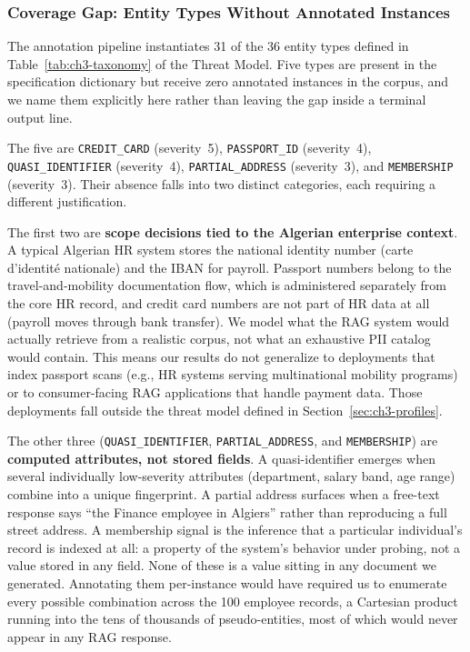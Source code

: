 \subsubsection{Coverage Gap: Entity Types Without Annotated Instances}
\label{ch3:subsec:coverage-gap}

The annotation pipeline instantiates 31 of the 36 entity types defined in Table~\ref{tab:ch3-taxonomy} of the Threat Model. Five types are present in the specification dictionary but receive zero annotated instances in the corpus, and we name them explicitly here rather than leaving the gap inside a terminal output line.

The five are \texttt{CREDIT\_CARD} (severity~5), \texttt{PASSPORT\_ID} (severity~4), \texttt{QUASI\_IDENTIFIER} (severity~4), \texttt{PARTIAL\_ADDRESS} (severity~3), and \texttt{MEMBERSHIP} (severity~3). Their absence falls into two distinct categories, each requiring a different justification.

The first two are \textbf{scope decisions tied to the Algerian enterprise context}. A typical Algerian HR system stores the national identity number (carte d'identité nationale) and the IBAN for payroll. Passport numbers belong to the travel-and-mobility documentation flow, which is administered separately from the core HR record, and credit card numbers are not part of HR data at all (payroll moves through bank transfer). We model what the RAG system would actually retrieve from a realistic corpus, not what an exhaustive PII catalog would contain. This means our results do not generalize to deployments that index passport scans (e.g., HR systems serving multinational mobility programs) or to consumer-facing RAG applications that handle payment data. Those deployments fall outside the threat model defined in Section~\ref{sec:ch3-profiles}.

The other three (\texttt{QUASI\_IDENTIFIER}, \texttt{PARTIAL\_ADDRESS}, and \texttt{MEMBERSHIP}) are \textbf{computed attributes, not stored fields}. A quasi-identifier emerges when several individually low-severity attributes (department, salary band, age range) combine into a unique fingerprint. A partial address surfaces when a free-text response says ``the Finance employee in Algiers'' rather than reproducing a full street address. A membership signal is the inference that a particular individual's record is indexed at all: a property of the system's behavior under probing, not a value stored in any field. None of these is a value sitting in any document we generated. Annotating them per-instance would have required us to enumerate every possible combination across the 100 employee records, a Cartesian product running into the tens of thousands of pseudo-entities, most of which would never appear in any RAG response.

